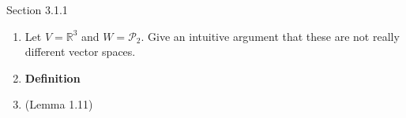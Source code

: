 \documentclass[11pt,fleqn]{article}
\begin{document}
\begin{center} Section 3.1.1 \end{center}
\begin{enumerate}
\item Let $V=\mathbb{R}^3$ and $W=\mathcal{P}_2$. Give an intuitive argument that these are not really different vector spaces.
\vfill
\item \textbf{Definition} 
\vfill
\item (Lemma 1.11) 
\vfill
\end{enumerate}
\end{document}

